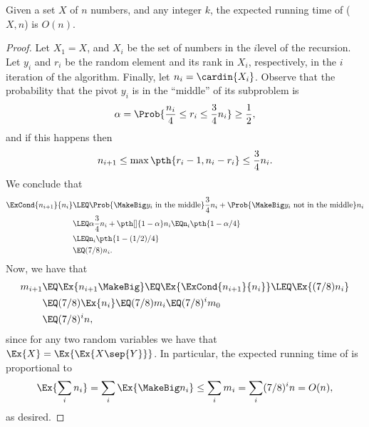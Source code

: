\begin{theorem}
    Given a set $X$ of $n$ numbers, and any integer $k$, the expected
    running time of \QuickSelect{}($X, n$) is $O(n)$.
\end{theorem}
\begin{proof}
    Let $X_1 = X$, and $X_i$ be the set of numbers in the $i$\th level
    of the recursion. Let $y_i$ and $r_i$ be the random element and
    its rank in $X_i$, respectively, in the $i$\th iteration of the
    algorithm. Finally, let $n_i = \cardin{X_i}$. Observe that the
    probability that the pivot $y_i$ is in the ``middle'' of its
    subproblem is
    \begin{align*}
      \alpha = \Prob{\smash{ \frac{n_i}{4} \leq r_i \leq \frac{3}{4}
      n_i} \Bigr.}
      \geq \frac{1}{2},
    \end{align*}
    and if this happens then
    \begin{align*}
        n_{i+1} \leq \max\pth{ r_i-1, n_{i} - r_i } \leq
        \frac{3}{4}n_i.
    \end{align*}
    We conclude that 
    \begin{align*}
      \ExCond{ n_{i+1}}{ n_i}%
      &\LEQ %
        \Prob{\MakeBig y_i\text{ in the middle}} \frac{3}{4} n_i +
        \Prob{\MakeBig y_i\text{ not in the middle}}
        n_i\\
        &\LEQ%
        \alpha \frac{3}{4}n_i + \pth[]{1-\alpha} n_i%
        \EQ%
        n_i \pth{ 1 - \alpha / 4}%
        \\&
        \LEQ%
        n_i \pth{ 1 - (1/2) / 4}%
        \\&
        \EQ %
        (7/8) n_i.
    \end{align*}
    Now, we have that 
    \begin{align*}
      m_{i+1}%
      &\EQ%
        \Ex{n_{i+1}\MakeBig}%
        \EQ%
        \Ex{\ExCond{ n_{i+1}}{ n_i}}%
        \LEQ%
        \Ex{(7/8)n_i}%
        \\&
        \EQ %
        (7/8) \Ex{n_i}
        \EQ%
        (7/8) m_i
        \EQ%
        (7/8)^i m_0
        \\&%
        \EQ
        (7/8)^i n,
    \end{align*}
    since for any two random variables we have that $\Ex{X} =
    \Ex{\Ex{X \sep{ Y} }}$. In particular, the expected running time
    of \QuickSelect is proportional to
    \begin{align*}
        \Ex{\sum_i n_i }%
        =%
        \sum_i \Ex{ \MakeBig n_i} %
        \leq%
        \sum_i m_i = \sum_i (7/8)^i n = O(n),
    \end{align*}
    as desired.
\end{proof}

